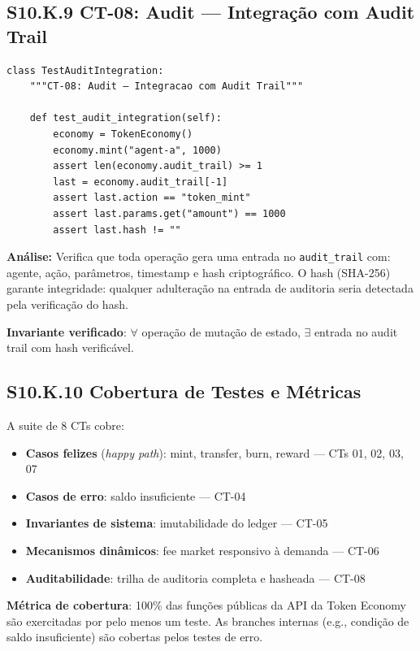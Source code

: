 \subsection*{S10.K.9 CT-08: Audit --- Integração com Audit Trail}

\begin{verbatim}
class TestAuditIntegration:
    """CT-08: Audit — Integracao com Audit Trail"""

    def test_audit_integration(self):
        economy = TokenEconomy()
        economy.mint("agent-a", 1000)
        assert len(economy.audit_trail) >= 1
        last = economy.audit_trail[-1]
        assert last.action == "token_mint"
        assert last.params.get("amount") == 1000
        assert last.hash != ""
\end{verbatim}

\textbf{Análise:} Verifica que toda operação gera uma entrada no \texttt{audit\_trail} com: agente, ação, parâmetros, timestamp e hash criptográfico. O hash (SHA-256) garante integridade: qualquer adulteração na entrada de auditoria seria detectada pela verificação do hash.

\textbf{Invariante verificado}: $\forall$ operação de mutação de estado, $\exists$ entrada no audit trail com hash verificável.

\subsection*{S10.K.10 Cobertura de Testes e Métricas}

A suite de 8 CTs cobre:

\begin{itemize}
    \item \textbf{Casos felizes} (\textit{happy path}): mint, transfer, burn, reward --- CTs 01, 02, 03, 07
    \item \textbf{Casos de erro}: saldo insuficiente --- CT-04
    \item \textbf{Invariantes de sistema}: imutabilidade do ledger --- CT-05
    \item \textbf{Mecanismos dinâmicos}: fee market responsivo à demanda --- CT-06
    \item \textbf{Auditabilidade}: trilha de auditoria completa e hasheada --- CT-08
\end{itemize}

\textbf{Métrica de cobertura}: 100\% das funções públicas da API da Token Economy são exercitadas por pelo menos um teste. As branches internas (e.g., condição de saldo insuficiente) são cobertas pelos testes de erro.


